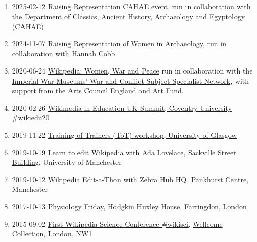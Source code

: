 \documentclass[
  12pt,
]{book}
\providecommand{\tightlist}{%
  \setlength{\itemsep}{0pt}\setlength{\parskip}{0pt}}
\begin{document}
\begin{enumerate}
\def\labelenumi{\arabic{enumi}.}
\tightlist
\item
  2025-02-12 \href{https://en.wikipedia.org/wiki/Wikipedia:Meetup/Raising_Representation_CAHAE_event}{Raising Representation CAHAE event}, run in collaboration with the \href{https://www.alc.manchester.ac.uk/cahae/}{Department of Classics, Ancient History, Archaeology and Egyptology} (CAHAE)
\item
  2024-11-07 \href{https://en.wikipedia.org/wiki/Wikipedia:Meetup/Raising_Representation}{Raising Representation} of Women in Archaeology, run in collaboration with Hannah Cobb
\item
  2020-06-24 \href{https://en.wikipedia.org/wiki/Wikipedia:Meetup/Women_in_War_and_Peace}{Wikipedia: Women, War and Peace} run in collaboration with the \href{https://www.iwm.org.uk/partnerships/subject-specialist-network}{Imperial War Museums' War and Conflict Subject Specialist Network}, with support from the Arts Council England and Art Fund.
\item
  2020-02-26 \href{https://wikiedusummit.coventry.domains}{Wikimedia in Education UK Summit, Coventry University} \#wikiedu20
\item
  2019-11-22 \href{https://duncan.hull.name/2019/12/10/glasgow/}{Training of Trainers (ToT) workshop, University of Glasgow}
\item
  2019-10-19 \href{https://wiki-loves-scientists.org.uk/2019/10/09/ada/}{Learn to edit Wikipedia with Ada Lovelace}, \href{https://en.wikipedia.org/wiki/Sackville_Street_Building}{Sackville Street Building}, University of Manchester \citep{findingada2019}
\item
  2019-10-12 \href{https://www.eventbrite.com/e/global-wikipedia-edit-a-thon-wikieditathon-2019-manchester-and-london-2019-zebra-hub-hq-the-tickets-48601581639}{Wikipedia Edit-a-Thon with Zebra Hub HQ}, \href{https://en.wikipedia.org/wiki/Pankhurst_Centre}{Pankhurst Centre}, Manchester
\item
  2017-10-13 \href{https://wiki-loves-scientists.org.uk/2017/10/27/mirror-mirror-on-the-wall-who-is-the-most-viewed-of-them-all/}{Physiology Friday, Hodgkin Huxley House}, Farringdon, London \citep{goodbadugly}
\item
  2015-09-02 \href{https://wikimedia.org.uk/wiki/Wikipedia_Science_Conference}{First Wikipedia Science Conference \#wikisci}, \href{https://en.wikipedia.org/wiki/Wellcome_Collection}{Wellcome Collection}, London, NW1 \citep{troubled, Hodson2015}
\end{enumerate}
\end{document}
